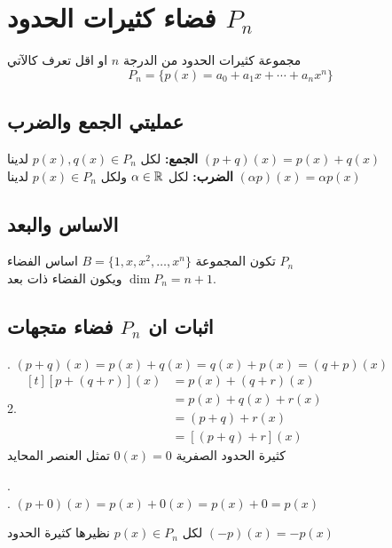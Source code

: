 \section{فضاء كثيرات الحدود $P_n$}
مجموعة كثيرات الحدود من الدرجة $n$ او اقل تعرف كالآتي
\[
P_n = \{p(x) = a_0 + a_1 x + \cdots + a_n x^n\}
\]
\subsection{عمليتي الجمع والضرب}
\textbf{الجمع:} لكل $p(x), q(x) \in P_n$ لدينا 
$
(p+q)(x) = p(x) + q(x)
$\\
\textbf{الضرب:} لكل $\alpha \in \mathbb{R}$ ولكل $p(x)\in P_n$ لدينا
$
(\alpha p)(x) = \alpha p(x)
$

\subsection{الاساس والبعد}
تكون المجموعة
$B = \{1, x, x^2, \dots, x^n\}$
اساس الفضاء $P_n$ \\
ويكون الفضاء ذات بعد $\dim P_n = n+1 $.

\subsection{اثبات ان $P_n$ فضاء متجهات}

. $(p+q)(x) = p(x) + q(x) = q(x) + p(x) = (q+p)(x)$\\
2. $
\begin{aligned}[t]
	[p+(q+r)](x) &= p(x) + (q+r)(x)\\
	&= p(x) + q(x) + r(x) \\
	&= (p+q) + r(x)\\
	&= [(p+q)+r](x)
\end{aligned}
$\\


\noindent
كثيرة الحدود الصفرية $0(x)=0 $ تمثل العنصر المحايد 

.\\
. $(p+0)(x) = p(x) + 0(x) = p(x) + 0 = p(x)$

\noindent
لكل $p(x)\in P_n$ نظيرها كثيرة الحدود $(-p)(x) = -p(x)$ 


